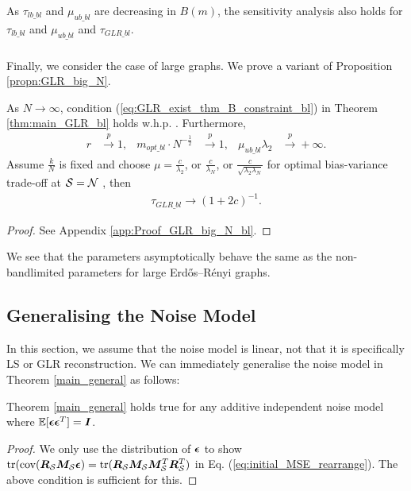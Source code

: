{As $\tau_{lb\_bl}$ and $\mu_{ub\_bl}$ are decreasing in $B(m)$, the sensitivity analysis also holds for $\tau_{lb\_bl}$ and $\mu_{ub\_bl}$ and $\tau_{GLR\_bl}$.
\fi

\subsubsection{}
Finally, we consider the case of large graphs. We prove a variant of Proposition \ref{propn:GLR_big_N}.
\begin{propn}
\label{propn:GLR_big_N_bl}
As $N \to \infty$, condition (\ref{eq:GLR_exist_thm_B_constraint_bl}) in Theorem \ref{thm:main_GLR_bl} holds w.h.p. . Furthermore,
\begin{align}
        r &\overset{p}{\to} 1, &
        {m_{opt\_bl}}\cdot{{N}}^{-\frac{1}{2}} &\overset{p}{\to} 1, &
    \mu_{ub\_bl}\lambda_{2} &\overset{p}{\to} +\infty.
\end{align}
    Assume $\frac{k}{N}$ is fixed and choose $\mu = \frac{c}{\lambda_{2}}$,  or $\frac{c}{\lambda_{N}}$, or $\frac{c}{\sqrt{\lambda_{2}\lambda_{N}} }$ for optimal bias-variance trade-off 
 at $\mathcal{S} = \mathcal{N}$ \cite{chen2017GLRbias}, then
    \begin{align}
        \tau_{GLR\_bl} \to (1+2c)^{-1}.
    \end{align}
\end{propn}
\begin{proof}
    See Appendix \ref{app:Proof_GLR_big_N_bl}.
\end{proof}

{\color{black} We see that the parameters asymptotically behave the same as the non-bandlimited parameters for large Erdős–Rényi graphs.}


\iffalse
\subsection{Generalising the Noise Model}
In this section, we assume that the noise model is linear, not that it is specifically LS or GLR reconstruction. 
We can immediately generalise the noise model in Theorem \ref{main_general} as follows:

\begin{remark}
    Theorem \ref{main_general} holds true for any additive independent noise model where $\mathbb{E}[\bm{\epsilon}\bm{\epsilon}^{T}] = \bm{I}$.
\end{remark}
\begin{proof}
    We only use the distribution of $\bm{\epsilon}$ to show $\textrm{tr}(\textrm{cov}(\bm{R}_{\mathcal{S}}\bm{M}_{\mathcal{S}}\bm{\epsilon}) = \textrm{tr}(\bm{R}_{\mathcal{S}}\bm{M}_{\mathcal{S}}     \bm{M}_{\mathcal{S}}^{T} \bm{R}_{\mathcal{S}}^{T})$ in Eq. (\ref{eq:initial_MSE_rearrange}). The above condition is sufficient for this.
\end{proof}

}
